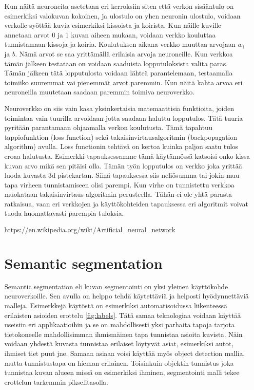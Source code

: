 Kun näitä neuroneita asetetaan eri kerroksiin siten että verkon sisääntulo on esimerkiksi valokuvan kokoinen, ja ulostulo on yhen neuronin ulostulo, voidaan verkolle syöttää kuvia esimerkiksi kissoista ja koirista. Kun näille kuville annetaan arvot 0 ja 1 kuvan aiheen mukaan, voidaan verkko kouluttaa tunnistamaan kissoja ja koiria. Koulutuksen aikana verkko muuttaa arvojaan \(w_i\) ja \(b\). Nämä arvot se saa yrittämällä erilaisia arvoja neuroneille. Kun verkkoa tämän jälkeen testataan on voidaan saaduista lopputuloksista valita paras. Tämän jälkeen tätä lopputulosta voidaan lähteä parantelemaan, testaamalla toimiiko suuremmat vai pienemmät arvot paremmin. Kun näitä kahta arvoa eri neuroneilla muutetaan saadaan paremmin toimiva neuroverkko.

Neuroverkko on siis vain kasa yksinkertaisia matemaattisia funktioita, joiden toimintaa vain tuurilla arvoidaan jotta saadaan haluttu lopputulos. Tätä tuuria pyritään parantamaan ohjaamalla verkon koulutusta. Tämä tapahtuu tappiofunktion (loss function) sekä takaisinvirtausalgoritmin (backpopagation algorithm) avulla. Loss functionin tehtävä on kertoa kuinka paljon saatu tulos eroaa halutusta. Esimerkki tapauksessamme tämä käytännössä katsoisi onko kissa kuvan arvo mikä sen pitäisi olla. Tämän työn lopputulos on verkko joka yrittää luoda kuvasta 3d pistekartan. Siinä tapauksessa siis neliösumma tai jokin muu tapa virheen tunnistamiseen olisi parempi. Kun virhe on tunnistettu verkkoa muokataan takaisinvirtaus algoritmin perusteella. Tähän ei ole yhtä parasta ratkaisua, vaan eri verkkojen ja käyttökohteiden tapauksessa eri algoritmit voivat tuoda huomattavasti parempia tuloksia.

\url{https://en.wikipedia.org/wiki/Artificial_neural_network}

\section{Semantic segmentation}

Semantic segmentation eli kuvan segmentointi on yksi yleinen käyttökohde neuroverkoille. Sen avulla on helppo tehdä käytettäviä ja helposti hyödynnettäviä malleja. Esimerkkejä käytöstä on esimerkiksi automatisoidussa liikenteessä erilaisten asioiden erottelu \ref{fig:labels}. Tätä samaa teknologiaa voidaan käyttää useisiin eri applikaatioihin ja se on mahdollisesti yksi parhaita tapoja tarjota tietokoneelle mahdollisimman ihmismäinen tapa tunnistaa asioita kuvista. Näin voidaan yhdestä kuvasta tunnistaa erilaiset löytyvät asiat, esimerkiksi autot, ihmiset tiet puut jne. Samaan asiaan voisi käyttää myös object detection mallia, mutta tunnistustapa on hieman erilainen. Toisinkuin objektin tunnistus joka tunnistaa kuvan alueen missä on esimerkiksi ihminen, segmentointi malli tekee erottelun tarkemmin pikselitasolla.

